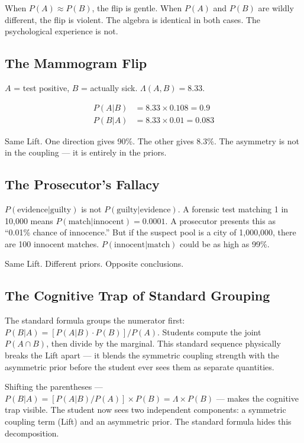 \documentclass[12pt]{article}
\begin{document}
When $P(A) \approx P(B)$, the flip is gentle. When $P(A)$ and $P(B)$ are wildly different, the flip is violent. The algebra is identical in both cases. The psychological experience is not.

\subsection{The Mammogram Flip}

$A$ = test positive, $B$ = actually sick. $\Lambda(A,B) = 8.33$.

\begin{align}
P(A|B) &= 8.33 \times 0.108 = 0.9 \\
P(B|A) &= 8.33 \times 0.01 = 0.083
\end{align}

Same Lift. One direction gives 90\%. The other gives 8.3\%. The asymmetry is not in the coupling --- it is entirely in the priors.

\subsection{The Prosecutor's Fallacy}

$P(\text{evidence}|\text{guilty})$ is not $P(\text{guilty}|\text{evidence})$. A forensic test matching 1 in 10,000 means $P(\text{match}|\text{innocent}) = 0.0001$. A prosecutor presents this as ``0.01\% chance of innocence.'' But if the suspect pool is a city of 1,000,000, there are 100 innocent matches. $P(\text{innocent}|\text{match})$ could be as high as 99\%.

Same Lift. Different priors. Opposite conclusions.

\subsection{The Cognitive Trap of Standard Grouping}

The standard formula groups the numerator first: $P(B|A) = [P(A|B) \cdot P(B)] / P(A)$. Students compute the joint $P(A \cap B)$, then divide by the marginal. This standard sequence physically breaks the Lift apart --- it blends the symmetric coupling strength with the asymmetric prior before the student ever sees them as separate quantities.

Shifting the parentheses --- $P(B|A) = [P(A|B)/P(A)] \times P(B) = \Lambda \times P(B)$ --- makes the cognitive trap visible. The student now sees two independent components: a symmetric coupling term (Lift) and an asymmetric prior. The standard formula hides this decomposition.
\end{document}
